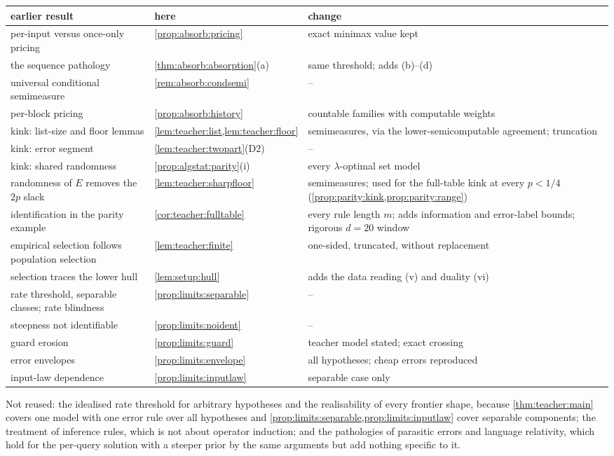 \begin{center}\small
\begin{tabularx}{\linewidth}{@{}>{\raggedright\arraybackslash}X>{\raggedright\arraybackslash}p{3.6cm}>{\raggedright\arraybackslash}X@{}}
\toprule
earlier result & here & change\\
\midrule
per-input versus once-only pricing & \cref{prop:absorb:pricing} & exact minimax value kept\\
the sequence pathology & \cref{thm:absorb:absorption}(a) & same threshold; adds (b)--(d)\\
universal conditional semimeasure & \cref{rem:absorb:condsemi} & --\\
per-block pricing & \cref{prop:absorb:history} & countable families with computable weights\\
kink: list-size and floor lemmas & \cref{lem:teacher:list,lem:teacher:floor} & semimeasures, via the lower-semicomputable agreement; truncation\\
kink: error segment & \cref{lem:teacher:twopart}(D2) & --\\
kink: shared randomness & \cref{prop:algstat:parity}(i) & every $\lambda$-optimal set model\\
randomness of $E$ removes the $2p$ slack & \cref{lem:teacher:sharpfloor} & semimeasures; used for the full-table kink at every $p<1/4$ (\cref{prop:parity:kink,prop:parity:range})\\
identification in the parity example & \cref{cor:teacher:fulltable} & every rule length $m$; adds information and error-label bounds; rigorous $d=20$ window\\
empirical selection follows population selection & \cref{lem:teacher:finite} & one-sided, truncated, without replacement\\
selection traces the lower hull & \cref{lem:setup:hull} & adds the data reading (v) and duality (vi)\\
rate threshold, separable classes; rate blindness & \cref{prop:limits:separable} & --\\
steepness not identifiable & \cref{prop:limits:noident} & --\\
guard erosion & \cref{prop:limits:guard} & teacher model stated; exact crossing\\
error envelopes & \cref{prop:limits:envelope} & all hypotheses; cheap errors reproduced\\
input-law dependence & \cref{prop:limits:inputlaw} & separable case only\\
\bottomrule
\end{tabularx}
\end{center}

Not reused: the idealised rate threshold for arbitrary hypotheses and the realisability of every frontier shape, because \cref{thm:teacher:main} covers one model with one error rule over all hypotheses and \cref{prop:limits:separable,prop:limits:inputlaw} cover separable components; the treatment of inference rules, which is not about operator induction; and the pathologies of parasitic errors and language relativity, which hold for the per-query solution with a steeper prior by the same arguments but add nothing specific to it.
